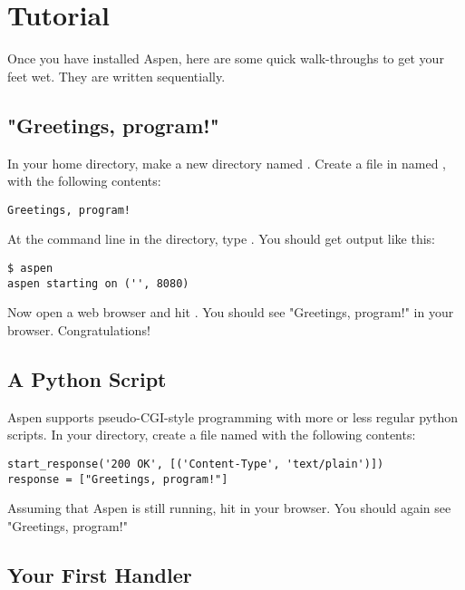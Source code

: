 \chapter{Tutorial \label{tutorial}}

Once you have installed Aspen, here are some quick walk-throughs to get your
feet wet. They are written sequentially.


\section{"Greetings, program!" \label{tutorial-greetings-program}}

In your home directory, make a new directory named . Create a
file in  named , with the following contents:

\begin{verbatim}
Greetings, program!
\end{verbatim}

At the command line in the  directory, type . You
should get output like this:

\begin{verbatim}
$ aspen
aspen starting on ('', 8080)
\end{verbatim}

Now open a web browser and hit . You should see
"Greetings, program!" in your browser. Congratulations!


\section{A Python Script \label{tutorial-pyscript}}

Aspen supports pseudo-CGI-style programming with more or less regular python
scripts. In your  directory, create a file named 
with the following contents:

\begin{verbatim}
start_response('200 OK', [('Content-Type', 'text/plain')])
response = ["Greetings, program!"]
\end{verbatim}

Assuming that Aspen is still running, hit  in
your browser. You should again see "Greetings, program!"


\section{Your First Handler \label{tutorial-handler}}

